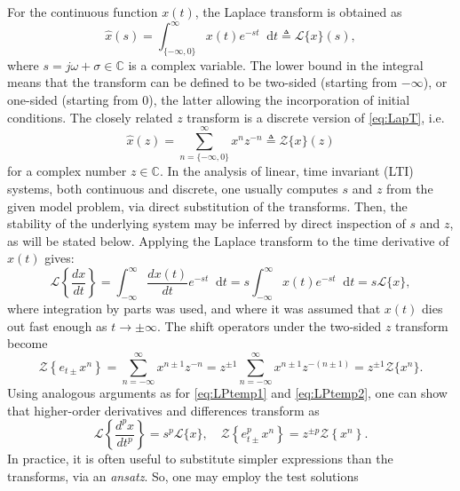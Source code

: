 \documentclass[11pt,twoside,a4paper,english]{book}
\newcommand{\dif}{\mathop{}\!\mathrm{d}}
\begin{document}
For the continuous function $x(t)$, the Laplace transform is obtained as
\begin{equation}\label{eq:LapT}
    \hat x(s) = \int_{\{-\infty,0\}}^{\infty} x(t) e^{-st} \dif t \triangleq \mathcal{L}\{x\}(s),
\end{equation}
where $s = j\omega + \sigma \in \mathbb{C}$ is a complex variable. The lower bound in the integral means that the transform can be defined to be two-sided (starting from $-\infty$), or one-sided (starting from 0), the latter allowing the incorporation of initial conditions. The closely related $z$ transform is a discrete version of \eqref{eq:LapT}, i.e. 
\begin{equation}\label{eq:ZT}
    \hat x(z) = \sum_{n = \{-\infty,0 \}}^{\infty} x^n z^{-n} \triangleq \mathcal{Z}\{x \}(z)
\end{equation}
for a complex number $z \in \mathbb{C}$. In the analysis of linear, time invariant (LTI) systems, both continuous and discrete, one usually computes $s$ and $z$ from the given model problem, via direct substitution of the transforms. Then, the stability of the underlying system may be inferred by direct inspection of $s$ and $z$, as will be stated below.  Applying the Laplace transform to the time derivative of $x(t)$ gives:
\begin{equation}\label{eq:LPtemp1}
    \mathcal{L}\left\{\frac{d x}{dt } \right\} = \int_{-\infty}^\infty\frac{dx(t)}{dt}e^{-st} \dif t = s \int_{-\infty}^{\infty} x(t) e^{-st} \dif t =  s\mathcal{L}\{x\},
\end{equation}
where integration by parts was used, and where it was assumed that $x(t)$ dies out fast enough as  $t\rightarrow \pm \infty$. The shift operators under the two-sided $z$ transform become
\begin{equation}\label{eq:LPtemp2}
    \mathcal{Z}\left\{e_{t\pm} x^n \right\} = \sum_{n = -\infty}^{\infty} x^{n\pm 1}z^{-n} = z^{\pm 1} \sum_{n = -\infty}^{\infty} x^{n\pm 1}z^{-(n\pm 1)} = z^{\pm 1} \mathcal{Z}\{x^n \}.
\end{equation}
Using analogous arguments as  for \eqref{eq:LPtemp1} and \eqref{eq:LPtemp2}, one can show that higher-order derivatives and differences transform as
\begin{equation}\label{eq:TransLZ}
    \mathcal{L}\left\{\frac{d^p x}{dt^p } \right\} = s^p \mathcal{L}\{x\}, \quad \mathcal{Z}\left\{e^p_{t\pm} x^n \right\} = z^{\pm p} \mathcal{Z}\left\{x^n \right\}.
\end{equation}
In practice, it is often useful to substitute simpler expressions than the transforms, via an \emph{ansatz}. So, one may employ the test solutions
\end{document}
